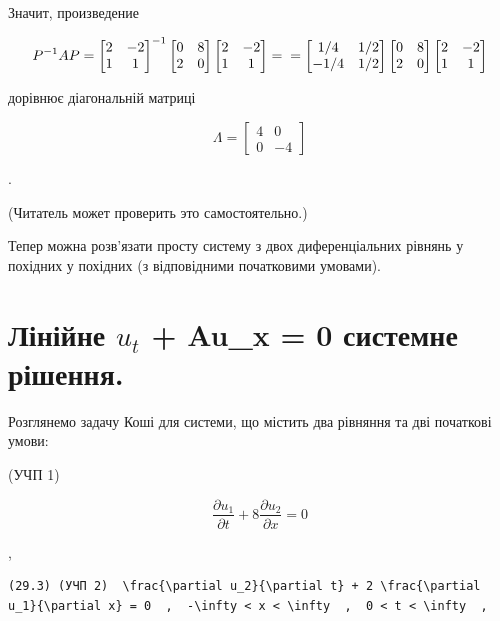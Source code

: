 \documentclass[
  ukrainian,
]{article}
\begin{document}
Значит, произведение

\[
P^{-1}AP =
\begin{bmatrix} 2 & -2 \\ 1 & 1 \end{bmatrix}
^{-1}
\begin{bmatrix} 0 & 8 \\ 2 & 0 \end{bmatrix}
\begin{bmatrix} 2 & -2 \\ 1 & 1 \end{bmatrix}
= \\ =
\begin{bmatrix} 1/4 & 1/2 \\ -1/4 & 1/2 \end{bmatrix}
\begin{bmatrix} 0 & 8 \\ 2 & 0 \end{bmatrix}
\begin{bmatrix} 2 & -2 \\ 1 & 1 \end{bmatrix}
\]

дорівнює діагональній матриці

\[
\Lambda =
\begin{bmatrix} 4 & 0 \\ 0 & -4 \end{bmatrix}
\]

.

(Читатель может проверить это самостоятельно.)

Тепер можна розв'язати просту систему з двох диференціальних рівнянь у
похідних у похідних (з відповідними початковими умовами).

\section{\texorpdfstring{Лінійне \(u_t\) + Au\_x = 0 системне
рішення.}{Лінійне u\_t + Au\_x = 0 системне рішення.}}\label{ux43bux456ux43dux456ux439ux43dux435-u_t-au_x-0-ux441ux438ux441ux442ux435ux43cux43dux435-ux440ux456ux448ux435ux43dux43dux44f.}

Розглянемо задачу Коші для системи, що містить два рівняння та дві
початкові умови:

(УЧП 1)

\[
\frac{\partial u_1}{\partial t} + 8 \frac{\partial u_2}{\partial x} = 0
\]

,

\begin{verbatim}
(29.3) (УЧП 2)  \frac{\partial u_2}{\partial t} + 2 \frac{\partial u_1}{\partial x} = 0  ,  -\infty < x < \infty  ,  0 < t < \infty  ,
\end{verbatim}
\end{document}
